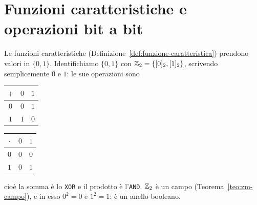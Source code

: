 \section{Funzioni caratteristiche e operazioni bit a bit}\label{sec:bit-a-bit}

Le funzioni caratteristiche (Definizione~\ref{def:funzione-caratteristica}) prendono valori in $\{0, 1\}$. Identifichiamo $\{0, 1\}$ con $\mathbb{Z}_2 = \{[0]_2, [1]_2\}$,
scrivendo semplicemente $0$ e $1$: le sue operazioni sono
\begin{center}
\renewcommand{\arraystretch}{1.15}
\begin{tabular}{c|cc}
    $+$ & $0$ & $1$ \\ \hline
    $0$ & $0$ & $1$ \\
    $1$ & $1$ & $0$ \\
\end{tabular}
\qquad\qquad
\begin{tabular}{c|cc}
    $\cdot$ & $0$ & $1$ \\ \hline
    $0$ & $0$ & $0$ \\
    $1$ & $0$ & $1$ \\
\end{tabular}
\end{center}
cioè la somma è lo \texttt{XOR} e il prodotto è l'\texttt{AND}. $\mathbb{Z}_2$ è un campo (Teorema~\ref{teo:zm-campo}), e in esso $0^2 = 0$ e $1^2 = 1$: è un anello booleano.


